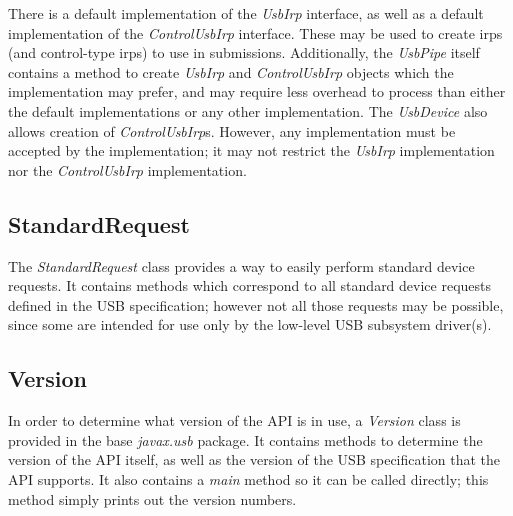 \documentclass{article}
\newcommand{\myclass}[1]{\emph{#1}}
\newcommand{\myinterface}[1]{\emph{#1}}
\newcommand{\mypackage}[1]{\emph{#1}}
\newcommand{\mymethod}[1]{\emph{#1}}
\begin{document}
There is a default implementation of the \myinterface{UsbIrp} interface, as well as a default
implementation of the \myinterface{ControlUsbIrp} interface.  These may be used to create irps
(and control-type irps) to use in submissions.  Additionally, the \myinterface{UsbPipe} itself
contains a method to create \myinterface{UsbIrp} and \myinterface{ControlUsbIrp} objects which
the implementation may prefer, and may require less overhead to process than either the default
implementations or any other implementation.  The \myinterface{UsbDevice} also allows creation of
\myinterface{ControlUsbIrp}s.  However, any implementation must be accepted by the implementation;
it may not restrict the \myinterface{UsbIrp} implementation nor the \myinterface{ControlUsbIrp}
implementation.

\subsection{StandardRequest}

The \myclass{StandardRequest} class provides a way to easily perform standard device requests.
It contains methods which correspond to all standard device requests defined in the USB
specification; however not all those requests may be possible, since some are intended for
use only by the low-level USB subsystem driver(s).

\subsection{Version}

In order to determine what version of the API is in use, a \myclass{Version} class is
provided in the base \mypackage{javax.usb} package.  It contains methods to determine
the version of the API itself, as well as the version of the USB specification
that the API supports.  It also contains a \mymethod{main} method so it can
be called directly; this method simply prints out the version numbers.
\end{document}
